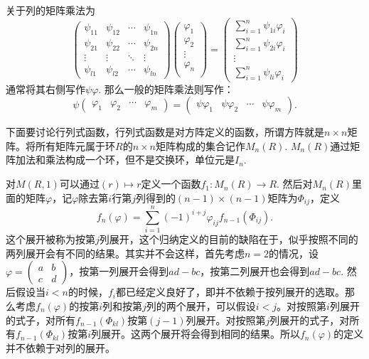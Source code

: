 关于列的矩阵乘法为
\begin{equation}
\begin{pmatrix}
	\psi_{11} & \psi_{12} & \cdots & \psi_{1n}\\
	\psi_{21} & \psi_{22} & \cdots & \psi_{2n}\\
	\vdots & \vdots & \ddots & \vdots \\
	\psi_{l1} & \psi_{l2} & \cdots & \psi_{ln}
\end{pmatrix}
\begin{pmatrix}
	\varphi_{1} \\
	\varphi_{2}  \\
	\vdots \\
	\varphi_{n} \\
\end{pmatrix}
=
\begin{pmatrix}
	\sum_{i=1}^n \psi_{1i}\varphi_{i}\\
	\sum_{i=1}^n \psi_{2i}\varphi_{i} \\
	\vdots \\
	\sum_{i=1}^n \psi_{li}\varphi_{i}
\end{pmatrix}
\end{equation}
通常将其右侧写作$\psi\varphi$. 那么一般的矩阵乘法则写作：
\[
	\psi
	\begin{pmatrix}
	\varphi_{1} & \varphi_{2} & \cdots & \varphi_{m}
	\end{pmatrix}
	=
	\begin{pmatrix}
	\psi\varphi_{1} & \psi\varphi_{2} & \cdots & \psi\varphi_{m}
	\end{pmatrix}.
\]

\para 下面要讨论行列式函数，行列式函数是对方阵定义的函数，所谓方阵就是$n\times n$矩阵。将所有矩阵元属于环$R$的$n\times n$矩阵构成的集合记作$M_n(R)$. $M_n(R)$通过矩阵加法和乘法构成一个环，但不是交换环，单位元是$I_n$. 

对$M(R,1)$可以通过$(r)\mapsto r$定义一个函数$f_1:M_n(R)\to R$. 然后对$M_n(R)$里面的矩阵$\varphi$，记$\varphi$除去第$i$行第$j$列得到的$(n-1)\times (n-1)$矩阵为$\Phi_{ij}$，定义
\[
	f_n(\varphi)=\sum_{i=1}^n (-1)^{i+j}\varphi_{ij}f_{n-1}(\Phi_{ij}).
\]
这个展开被称为按第$j$列展开，这个归纳定义的目前的缺陷在于，似乎按照不同的两列展开会有不同的结果。其实并不会这样，首先考虑$n=2$的情况，设$\varphi=\begin{pmatrix}a&b\\c&d\end{pmatrix}$，按第一列展开会得到$ad-bc$，按第二列展开也会得到$ad-bc$. 然后假设当$i<n$的时候，$f_i$都已经定义良好了，即并不依赖于按列展开的选取。那么考虑$f_n(\varphi)$的按第$i$列和按第$j$列的两个展开，可以假设$i<j$。对按照第$i$列展开的式子，对所有$f_{n-1}(\Phi_{kl})$按第$(j-1)$列展开。对按照第$j$列展开的式子，对所有$f_{n-1}(\Phi_{kl})$按第$i$列展开。这两个展开将会得到相同的结果。所以$f_n(\varphi)$的定义并不依赖于对列的展开。

